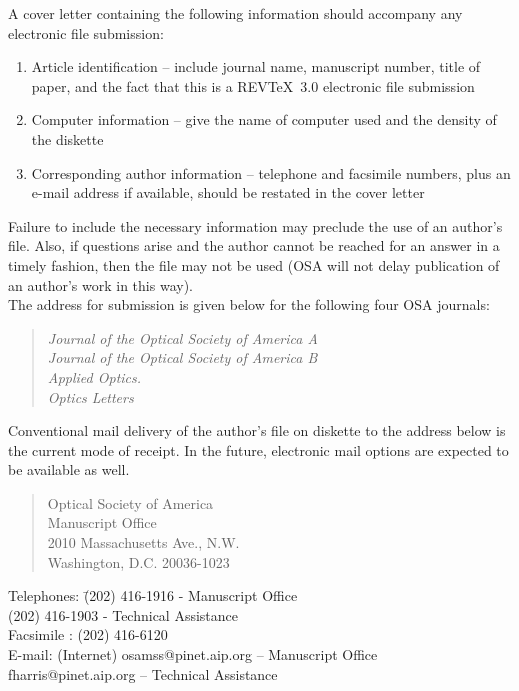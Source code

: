    A cover letter containing the following information should
accompany any electronic file submission:
\begin{itemize}
  \begin{enumerate}

  \item   Article identification -- include journal name,
          manuscript number, title of paper, and the fact that
          this is a REV\TeX\ 3.0 electronic file submission

  \item   Computer information --  give the name of computer used
          and the density of the diskette

  \item   Corresponding author information -- telephone and
          facsimile numbers, plus an e-mail address if available,
          should be restated in the cover letter
  \end{enumerate}
\end{itemize}

     Failure to include the necessary information may preclude
the use of an author's file.  Also, if questions arise and the
author cannot be reached for an answer in a timely fashion, then
the file may not be used (OSA will not delay publication of an
author's work in this way).  \\

     The address for submission is given below for the following
four OSA journals:
\begin{quote}
  {\it  Journal of the Optical Society of America A \\
        Journal of the Optical Society of America B \\
        Applied Optics.                             \\
        Optics Letters                     \\        }
\end{quote}
Conventional mail delivery of
the author's file on diskette to the address below is the current
mode of receipt.  In the future, electronic mail options are
expected to be available as well.
 \begin{quote}
          Optical Society of America     \\
          Manuscript Office              \\
          2010 Massachusetts Ave., N.W.  \\
          Washington, D.C.  20036-1023   \\
 \end{quote}
\begin{tabbing}
       Telephones: \= (202) 416-1916 - Manuscript Office\\
                   \> (202) 416-1903 - Technical Assistance \\
       Facsimile : \> (202) 416-6120                 \\
       E-mail: \> (Internet) osamss@pinet.aip.org -- Manuscript Office\\
    \>  fharris@pinet.aip.org -- Technical Assistance %
\end{tabbing}


